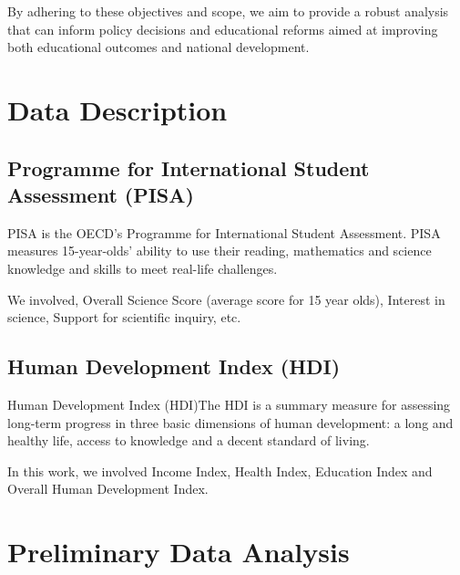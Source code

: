 \documentclass[12pt]{article}
\begin{document}
By adhering to these objectives and scope, we aim to provide a robust analysis that can inform policy decisions and educational reforms aimed at improving both educational outcomes and national development.



\section{Data Description}


\subsection{Programme for International Student Assessment (PISA)}

\label{ss.pisa}
PISA is the OECD's Programme for International Student Assessment. PISA measures 15-year-olds’ ability to use their reading, mathematics and science knowledge and skills to meet real-life challenges.

We involved, Overall Science Score (average score for 15 year olds),  Interest in science, Support for scientific inquiry, etc. 

\subsection{Human Development Index (HDI)}

\label{ss.hdi}
Human Development Index (HDI)The HDI is a summary measure for assessing long-term progress in three basic dimensions of human development: a long and healthy life, access to knowledge and a decent standard of living.

In this work, we involved Income Index, Health Index, Education Index and Overall Human Development Index.

\section{Preliminary Data Analysis}

\end{document}
